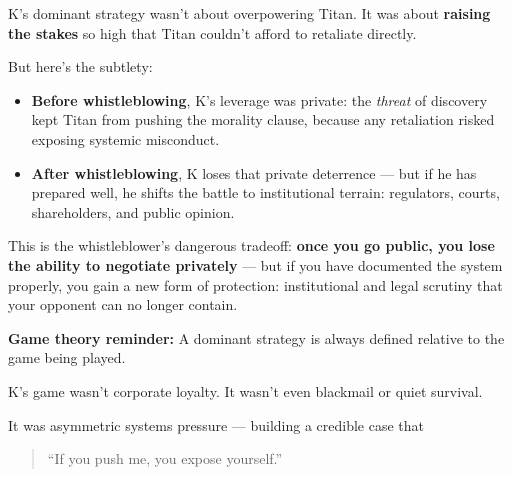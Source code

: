 \medskip

K’s dominant strategy wasn’t about overpowering Titan.  
It was about \textbf{raising the stakes} so high that Titan couldn’t afford to retaliate directly.

\medskip

But here’s the subtlety:

\begin{itemize}
    \item \textbf{Before whistleblowing}, K’s leverage was private:  
    the \textit{threat} of discovery kept Titan from pushing the morality clause, because any retaliation risked exposing systemic misconduct.

    \item \textbf{After whistleblowing}, K loses that private deterrence —  
    but if he has prepared well, he shifts the battle to institutional terrain:  
    regulators, courts, shareholders, and public opinion.
\end{itemize}

This is the whistleblower’s dangerous tradeoff:  
\textbf{once you go public, you lose the ability to negotiate privately} —  
but if you have documented the system properly, you gain a new form of protection:  
institutional and legal scrutiny that your opponent can no longer contain.

\medskip

\textbf{Game theory reminder:} A dominant strategy is always defined relative to the game being played.

K’s game wasn’t corporate loyalty.
It wasn’t even blackmail or quiet survival.

It was asymmetric systems pressure — building a credible case that  
\begin{quote}
    ``If you push me, you expose yourself.''
\end{quote}

\medskip

